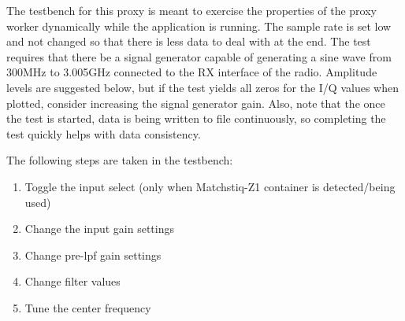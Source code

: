 \documentclass{article}
\begin{document}
The testbench for this proxy is meant to exercise the properties of the proxy worker dynamically while the application is running. The sample rate is set low and not changed so that there is less data to deal with at the end. The test requires that there be a signal generator capable of generating a sine wave from 300MHz to 3.005GHz connected to the RX interface of the radio. Amplitude levels are suggested below, but if the test yields all zeros for the I/Q values when plotted, consider increasing the signal generator gain. Also, note that the once the test is started, data is being written to file continuously, so completing the test quickly helps with data consistency.\par\medskip
\noindent The following steps are taken in the testbench:
\begin{enumerate}
	\item Toggle the input select (only when Matchstiq-Z1 container is detected/being used)
	\item Change the input gain settings
	\item Change pre-lpf gain settings
	\item Change filter values
	\item Tune the center frequency
\end{enumerate}

\newpage
\end{document}
